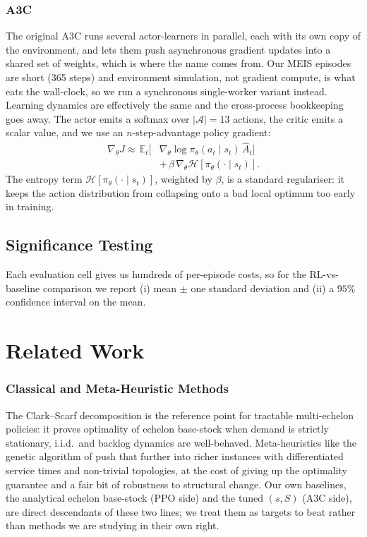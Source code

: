 \documentclass[letterpaper]{article} %
\begin{document}
\subsubsection{A3C}
The original A3C \citep{mnih2016a3c} runs several actor-learners
in parallel, each with its own copy of the environment, and lets
them push asynchronous gradient updates into a shared set of
weights, which is where the name comes from.  Our MEIS episodes
are short (\num{365} steps) and environment simulation, not
gradient compute, is what eats the wall-clock, so we run a
synchronous single-worker variant instead.  Learning dynamics are
effectively the same and the cross-process bookkeeping goes
away.  The actor emits a softmax over $|\mathcal{A}|{=}13$
actions, the critic emits a scalar value, and we use an
$n$-step-advantage policy gradient:
\begin{equation}
\begin{aligned}
\nabla_\theta J \approx\,
  \mathbb{E}_t\big[&\nabla_\theta\log\pi_\theta(a_t\mid s_t)\,\hat A_t\big]\\
  &+\,\beta\,\nabla_\theta \mathcal{H}[\pi_\theta(\cdot\mid s_t)].
\end{aligned}
\label{eq:a3cpg}
\end{equation}
The entropy term $\mathcal{H}[\pi_\theta(\cdot\mid s_t)]$,
weighted by $\beta$, is a standard regulariser: it keeps the
action distribution from collapsing onto a bad local optimum too
early in training.

\subsection{Significance Testing}
Each evaluation cell gives us hundreds of per-episode costs, so
for the RL-vs-baseline comparison we report (i) mean $\pm$ one
standard deviation and (ii) a $95\%$ confidence interval on the
mean.

\section{Related Work}
\label{sec:rel}

\subsubsection{Classical and Meta-Heuristic Methods}
The Clark--Scarf decomposition is the reference point for
tractable multi-echelon policies: it proves optimality of
echelon base-stock when demand is strictly stationary, i.i.d.\
and backlog dynamics are well-behaved.
Meta-heuristics like the genetic algorithm of
\citet{grahl2016meta} push that further into richer instances
with differentiated service times and non-trivial topologies, at
the cost of giving up the optimality guarantee and a fair bit of
robustness to structural change.  Our own baselines, the
analytical echelon base-stock (PPO side) and the tuned $(s,S)$
(A3C side), are direct descendants of these two lines; we treat
them as targets to beat rather than methods we are studying in
their own right.
\end{document}

